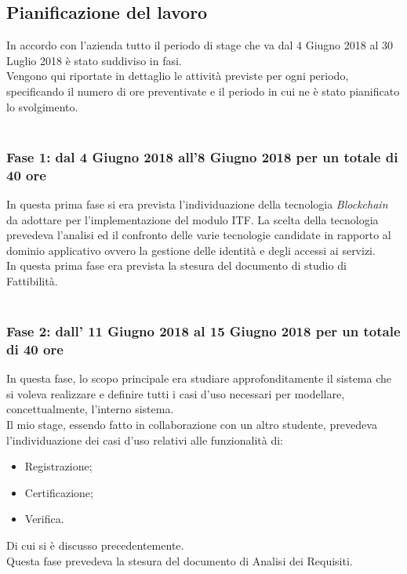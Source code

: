 \subsection{Pianificazione del lavoro}
In accordo con l'azienda tutto il periodo di stage che va dal 4 Giugno 2018 al 30 Luglio 2018 è stato suddiviso in fasi.\\
Vengono qui riportate in dettaglio le attività previste per ogni periodo, specificando il numero di ore preventivate e il periodo in cui ne è stato pianificato lo svolgimento.\\\\
\subsubsection{Fase 1: dal 4 Giugno 2018 all'8 Giugno 2018 per un totale di 40 ore}
In questa prima fase si era prevista l'individuazione della tecnologia \textit{Blockchain} da adottare per l'implementazione del modulo \gls{ITF}. La scelta della tecnologia prevedeva l'analisi ed il confronto delle varie tecnologie candidate in rapporto al dominio applicativo ovvero la gestione delle identità e degli accessi ai servizi.\\
In questa prima fase era prevista la stesura del documento di studio di Fattibilità.\\\\

\subsubsection{Fase 2: dall' 11 Giugno 2018 al 15 Giugno 2018 per un totale di 40 ore}
In questa fase, lo scopo principale era studiare approfonditamente il sistema che si voleva realizzare e definire tutti i casi d'uso necessari per modellare, concettualmente, l'interno sistema.\\
Il mio stage, essendo fatto in collaborazione con un altro studente, prevedeva l'individuazione dei casi d'uso relativi alle funzionalità di:
\begin{itemize}
	\item Registrazione;
	\item Certificazione;
	\item Verifica.
\end{itemize}
Di cui si è discusso precedentemente.\\
Questa fase prevedeva la stesura del documento di Analisi dei Requisiti.\\\\

